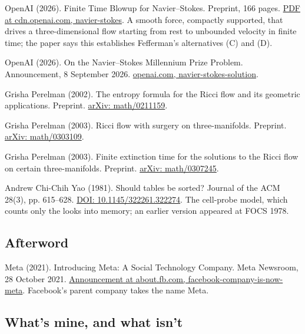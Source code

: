 \documentclass[11pt,twoside]{article}
\theoremstyle{thielethm}
\theoremstyle{thieledef}
\theoremstyle{thieledef}
\theoremstyle{thieledef}
\theoremstyle{thielethm}
\theoremstyle{thieleobs}
\theoremstyle{thielethm}
\begin{document}
\noindent OpenAI (2026). Finite Time Blowup for Navier--Stokes. Preprint, 166 pages. \href{https://cdn.openai.com/pdf/32d9f210-8b73-45e0-91bc-82a30aef8a9a/navier-stokes.pdf}{PDF at cdn.openai.com, navier-stokes}. A smooth force, compactly supported, that drives a three-dimensional flow starting from rest to unbounded velocity in finite time; the paper says this establishes Fefferman's alternatives (C) and (D).
\par\medskip

\noindent OpenAI (2026). On the Navier--Stokes Millennium Prize Problem. Announcement, 8 September 2026. \href{https://openai.com/index/navier-stokes-solution/}{openai.com, navier-stokes-solution}.
\par\medskip

\noindent Grisha Perelman (2002). The entropy formula for the Ricci flow and its geometric applications. Preprint. \href{https://arxiv.org/abs/math/0211159}{arXiv: math/0211159}.
\par\medskip

\noindent Grisha Perelman (2003). Ricci flow with surgery on three-manifolds. Preprint. \href{https://arxiv.org/abs/math/0303109}{arXiv: math/0303109}.
\par\medskip

\noindent Grisha Perelman (2003). Finite extinction time for the solutions to the Ricci flow on certain three-manifolds. Preprint. \href{https://arxiv.org/abs/math/0307245}{arXiv: math/0307245}.
\par\medskip

\noindent Andrew Chi-Chih Yao (1981). Should tables be sorted? Journal of the ACM 28(3), pp. 615--628. \href{https://doi.org/10.1145/322261.322274}{DOI: 10.1145/322261.322274}. The cell-probe model, which counts only the looks into memory; an earlier version appeared at FOCS 1978.
\par\medskip

\subsection*{Afterword}

\noindent Meta (2021). Introducing Meta: A Social Technology Company. Meta Newsroom, 28 October 2021. \href{https://about.fb.com/news/2021/10/facebook-company-is-now-meta/}{Announcement at about.fb.com, facebook-company-is-now-meta}. Facebook's parent company takes the name Meta.
\par\medskip

\subsection*{What's mine, and what isn't}
\end{document}
